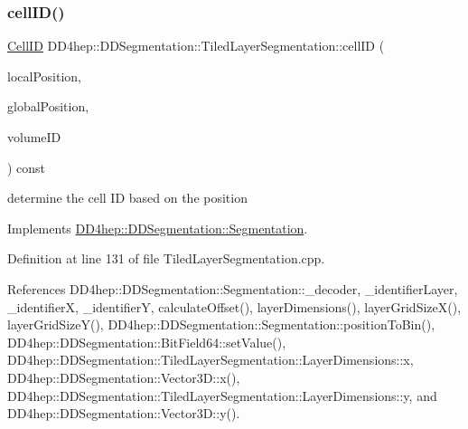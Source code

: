 \subsubsection{\texorpdfstring{cell\+I\+D()}{cellID()}}
{\footnotesize\ttfamily \hyperlink{namespace_d_d4hep_1_1_d_d_segmentation_ac7af071d85cb48820914434a07e21ba1}{Cell\+ID} D\+D4hep\+::\+D\+D\+Segmentation\+::\+Tiled\+Layer\+Segmentation\+::cell\+ID (\begin{DoxyParamCaption}\item[{const \hyperlink{struct_d_d4hep_1_1_d_d_segmentation_1_1_vector3_d}{Vector3D} \&}]{local\+Position,  }\item[{const \hyperlink{struct_d_d4hep_1_1_d_d_segmentation_1_1_vector3_d}{Vector3D} \&}]{global\+Position,  }\item[{const \hyperlink{namespace_d_d4hep_1_1_d_d_segmentation_a61a6833a18d1800bdef176595f83e3ba}{Volume\+ID} \&}]{volume\+ID }\end{DoxyParamCaption}) const\hspace{0.3cm}{\ttfamily [virtual]}}



determine the cell ID based on the position 



Implements \hyperlink{class_d_d4hep_1_1_d_d_segmentation_1_1_segmentation_ad5a60953d96d409850d8192f64f8ce3c}{D\+D4hep\+::\+D\+D\+Segmentation\+::\+Segmentation}.



Definition at line 131 of file Tiled\+Layer\+Segmentation.\+cpp.



References D\+D4hep\+::\+D\+D\+Segmentation\+::\+Segmentation\+::\+\_\+decoder, \+\_\+identifier\+Layer, \+\_\+identifierX, \+\_\+identifierY, calculate\+Offset(), layer\+Dimensions(), layer\+Grid\+Size\+X(), layer\+Grid\+Size\+Y(), D\+D4hep\+::\+D\+D\+Segmentation\+::\+Segmentation\+::position\+To\+Bin(), D\+D4hep\+::\+D\+D\+Segmentation\+::\+Bit\+Field64\+::set\+Value(), D\+D4hep\+::\+D\+D\+Segmentation\+::\+Tiled\+Layer\+Segmentation\+::\+Layer\+Dimensions\+::x, D\+D4hep\+::\+D\+D\+Segmentation\+::\+Vector3\+D\+::x(), D\+D4hep\+::\+D\+D\+Segmentation\+::\+Tiled\+Layer\+Segmentation\+::\+Layer\+Dimensions\+::y, and D\+D4hep\+::\+D\+D\+Segmentation\+::\+Vector3\+D\+::y().

\hypertarget{class_d_d4hep_1_1_d_d_segmentation_1_1_tiled_layer_segmentation_aaf31f761a41c419918eea054b6a11cb8}{}\label{class_d_d4hep_1_1_d_d_segmentation_1_1_tiled_layer_segmentation_aaf31f761a41c419918eea054b6a11cb8} 
